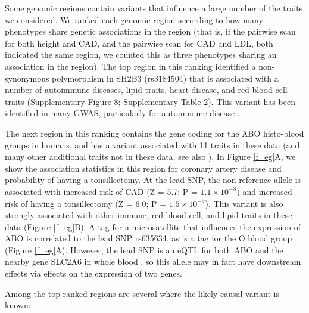 \documentclass[11pt,titlepage]{article}
\begin{document}
Some genomic regions contain variants that influence a large number of the traits we considered. 
We ranked each genomic region according to how many phenotypes share genetic associations in the region (that is, if the pairwise scan for both height and CAD, and the pairwise scan for CAD and LDL, both indicated the same region, we counted this as three phenotypes sharing an association in the region).
The top region in this ranking identified a non-synonymous polymorphism in SH2B3 (rs3184504) that is associated with a number of autoimmune diseases, lipid traits, heart disease, and red blood cell traits (Supplementary Figure 8; Supplementary Table 2). 
This variant has been identified in many GWAS, particularly for autoimmune disease \citep{Richard-Miceli:2012aa}.

The next region in this ranking contains the gene coding for the ABO histo-blood groups in humans, and has a variant associated with 11 traits in these data (and many other additional traits not in these data, see also \citep{Li:2014aa, Schunkert:2011aa, Wessel:2015aa, Franchini:2015aa}). 
In Figure \ref{f_eg}A, we show the association statistics in this region for coronary artery disease and probability of having a tonsillectomy.
At the lead SNP, the non-reference allele is associated with increased risk of CAD (Z = 5.7; P = $1.1 \times 10^{-8}$) and increased risk of having a tonsillectomy (Z = 6.0; P = $1.5 \times 10^{-9}$). 
This variant is also strongly associated with other immune, red blood cell, and lipid traits in these data (Figure \ref{f_eg}B). 
A tag for a microsatellite that influences the expression of ABO \citep{Kominato:1997aa} is correlated to the lead SNP rs635634, as is a tag for the O blood group (Figure \ref{f_eg}A). 
However, the lead SNP is an eQTL for both ABO and the nearby gene SLC2A6 in whole blood \citep{Wessel:2015aa}, so this allele may in fact have downstream effects via effects on the expression of two genes.

Among the top-ranked regions are several where the likely causal variant is known:
\end{document}
